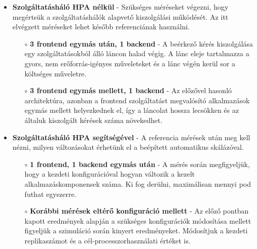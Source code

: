\begin{itemize}
	\item \textbf{Szolgáltatásháló HPA nélkül} - Szükséges méréseket végezni, hogy megértsük a szolgáltatáshálók alapvető kiszolgálási működését. Az itt elvégzett méréseket lehet később referenciának használni.
	\begin{itemize}
		\item[$\circ$] \textbf{3 frontend egymás után, 1 backend} - A beérkező kérés kiszolgálása  egy szolgáltatásokból álló láncon halad végig. A lánc eleje tartalmazza a gyors, nem erőforrás-igényes műveleteket és a lánc végén kerül sor a költséges műveletre. 
		
		\item[$\circ$] \textbf{3 frontend egymás mellett, 1 backend} - Az előzővel hasonló architektúra, azonban a frontend szolgáltatást megvalósító alkalmazások egymás mellett helyezkednek el, így a láncolat hossza lecsökken és az általuk kiszolgált kérések száma növekedhet.
	\end{itemize}
	
	\item \textbf{Szolgáltatásháló HPA segítségével} - A referencia mérések után meg kell nézni, milyen változásokat érhetünk el a beépített automatikus skálázóval.
	
	\begin{itemize}
		\item[$\circ$] \textbf{1 frontend, 1 backend egymás után} - A mérés során megfigyeljük, hogy a kezdeti konfigurációval hogyan változik a kezelt alkalmazáskomponensek száma. Ki fog derülni, maximálisan mennyi pod futhat egyszerre. 
		
		\item[$\circ$] \textbf{Korábbi mérések eltérő konfiguráció mellett} - Az előző pontban kapott eredmények alapján a szükséges konfigurációk módosítása mellett figyeljük a szimuláció során kinyert eredményeket. Módosítjuk a kezdeti replikaszámot és a cél-processzorhasználati értéket is.
		
	\end{itemize}
	
\end{itemize}



